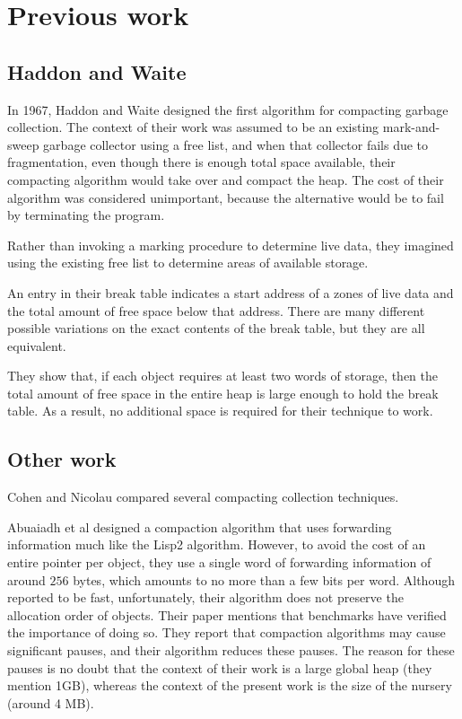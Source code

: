 \section{Previous work}

\subsection{Haddon and Waite}

In 1967, Haddon and Waite \cite{Haddon:1967} designed the first
algorithm for compacting garbage collection.  The context of their
work was assumed to be an existing mark-and-sweep garbage collector
using a free list, and when that collector fails due to fragmentation,
even though there is enough total space available, their compacting
algorithm would take over and compact the heap.  The cost of their
algorithm was considered unimportant, because the alternative would be
to fail by terminating the program.

Rather than invoking a marking procedure to determine live data, they
imagined using the existing free list to determine areas of available
storage. 

An entry in their break table indicates a start address of a zones of
live data and the total amount of free space below that address.
There are many different possible variations on the exact contents of
the break table, but they are all equivalent.

They show that, if each object requires at least two words of storage,
then the total amount of free space in the entire heap is large enough
to hold the break table.  As a result, no additional space is
required for their technique to work.

\subsection{Other work}

Cohen and Nicolau \cite{Cohen:1983:CCA:69575.357226} compared several
compacting collection techniques.

Abuaiadh et al \cite{Abuaiadh:2004:EPH:1028976.1028995} designed a
compaction algorithm that uses forwarding information much like the
Lisp2 algorithm.  However, to avoid the cost of an entire pointer per
object, they use a single word of forwarding information of around
$256$ bytes, which amounts to no more than a few bits per word.
Although reported to be fast, unfortunately, their algorithm does not
preserve the allocation order of objects.  Their paper mentions that
benchmarks have verified the importance of doing so.  They report that
compaction algorithms may cause significant pauses, and their
algorithm reduces these pauses.  The reason for these pauses is no
doubt that the context of their work is a large global heap (they
mention 1GB), whereas the context of the present work is the size of
the nursery (around 4 MB).

